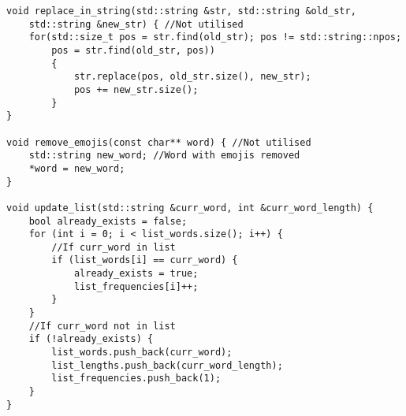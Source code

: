 \documentclass[a4paper,11pt]{article}
\begin{document}
\begin{appendices}
\begin{verbatim}
void replace_in_string(std::string &str, std::string &old_str, 
    std::string &new_str) { //Not utilised
    for(std::size_t pos = str.find(old_str); pos != std::string::npos;
        pos = str.find(old_str, pos))
        {
            str.replace(pos, old_str.size(), new_str);
            pos += new_str.size();
        }
}

void remove_emojis(const char** word) { //Not utilised
    std::string new_word; //Word with emojis removed
    *word = new_word;
}

void update_list(std::string &curr_word, int &curr_word_length) {
    bool already_exists = false;
    for (int i = 0; i < list_words.size(); i++) {
        //If curr_word in list
        if (list_words[i] == curr_word) {
            already_exists = true;
            list_frequencies[i]++;
        }
    }
    //If curr_word not in list
    if (!already_exists) {
        list_words.push_back(curr_word);
        list_lengths.push_back(curr_word_length);
        list_frequencies.push_back(1);
    }
}
\end{verbatim}

\end{appendices}
\end{document}
